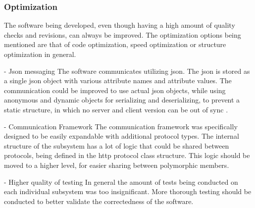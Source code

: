 \subsubsection{Optimization}

The software being developed, even though having a high amount of quality checks and revisions, can always be improved.
The optimization options being mentioned are that of code optimization, speed optimization or structure optimization in general.

- Json messaging
The software communicates utilizing json. The json is stored as a single json object with various attribute names and attribute values.
The communication could be improved to use actual json objects, while using anonymous and dynamic objects for serializing and deserializing, to prevent a static structure, in which no server and client version can be out of sync .

- Communication Framework
The communication framework was specifically designed to be easily expandable with additional protocol types. The internal structure of the subsystem has a lot of logic that could be shared between protocols, being defined in the http protocol class structure. This logic should be moved to a higher level, for easier sharing between polymorphic members.

- Higher quality of testing
In general the amount of tests being conducted on each individual subsystem was too insignificant. More thorough testing should be conducted to better validate the correctedness of the software.
